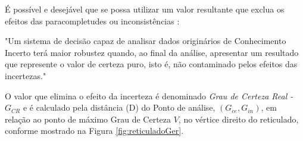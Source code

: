
É possível e desejável que se possa utilizar um valor resultante que
exclua os efeitos das paracompletudes ou inconsistências \cite{JairJoaoGermano}:

\begin{citacao}
{
"Um sistema de decisão capaz de analisar dados originários de Conhecimento Incerto terá maior robustez quando, 
ao final da análise,
apresentar um resultado que represente o valor de certeza puro, 
isto é, não contaminado pelos efeitos das incertezas."
}
\end{citacao}

O valor que elimina o efeito da incerteza é denominado \emph{Grau de Certeza Real - $G_{CR}$} 
e é calculado pela distância (D) do Ponto de análise, $(G_{ce},G_{in})$, 
em relação ao ponto de máximo Grau de Certeza $V$,
no vértice direito do reticulado, 
conforme mostrado na Figura \ref{fig:reticuladoGer}.


